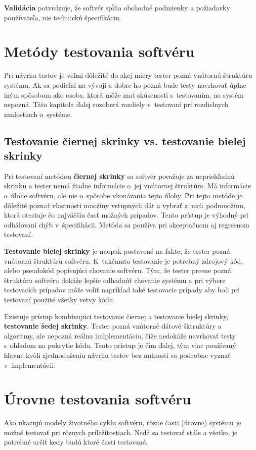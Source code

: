 \textbf{Validácia} potvrdzuje, že softvér spĺňa obchodné podmienky a požiadavky používateľa, nie technickú špecifikáciu.

\section{Metódy testovania softvéru}
Pri návrhu testov je veľmi dôležité do akej miery tester pozná vnútornú štruktúru systému.
Ak sa podieľal na vývoji a dobre ho pozná bude testy navrhovať úplne iným spôsobom ako osoba, ktorá môže mať skúsenosti s~testovaním, no systém nepozná.
Táto kapitola ďalej rozoberá rozdiely v~testovaní pri rozdielnych znalostiach o~systéme.

\subsection*{Testovanie čiernej skrinky vs. testovanie bielej skrinky}
\label{blackbox_vs_whitebox}
Pri testovaní metódou \textbf{čiernej skrinky} sa softvér považuje za nepriehľadnú skrinku a tester nemá žiadne informácie o~jej vnútornej štruktúre.
Má informácie o~úlohe softvéru, ale nie o~spôsobe vkonávania tejto úlohy.
Pri tejto metóde je dôležité poznať vlastnosti množiny vstupných dát a vybrať z~nich podmnožinu, ktorá otestuje čo najväčšiu časť možných prípadov.
Tento prístup je výhodný pri odhǎlovaní chýb v~špecifikácii.
Metóda sa používa pri akceptačnom aj regresnom testovaní.

\textbf{Testovanie bielej skrinky} je naopak postavené na fakte, že tester pozná vnútornú štruktúru softvéru.
K~takémuto testovanie je potrebný zdrojový kód, alebo pseudokód popisujúci chovanie softvéru.
Tým, že tester presne pozná štruktúru softvéru dokáže lepšie odhadnúť chovanie systému a pri výbere testovacích prípadov môže voliť napríklad také testovacie prípady aby boli pri testovaní použité všetky vetvy kódu.

Existuje prístup kombinujúci testovanie čiernej a testovanie bielej skrinky, \textbf{testovanie šedej skrinky}.
Tester pozná vnútorné dátové šktruktúry a algoritmy, ale nepozná reálnu imlplementáciu, čiže nedokáže navrhovať testy s~ohľadom na pokrytie kódu.
Tento prístup je čím ďalej, tým viac používaný hlavne kvôli zjednodušeniu návrhu testov bez nutnosti sa podrobne vyznať v~implementácii.

\section{Úrovne testovania softvéru}
\label{testing_levels}
Ako ukazujú modely životného cyklu softvéru, rôzne časti (úrovne) systému je možné testovať pri rôznych príležitostiach. 
Nedá sa testovať stále a všetko, je potrebné určiť kedy budú ktoré časti testované.

